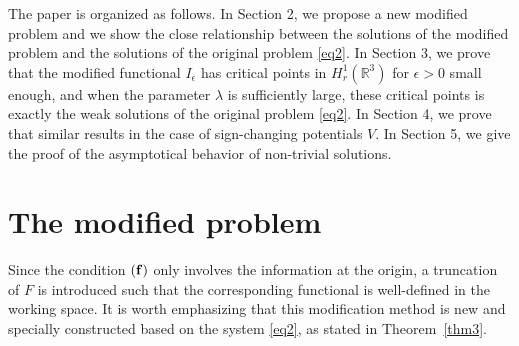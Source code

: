 \documentclass[12pt]{amsart}
\numberwithin{equation}{section}
\theoremstyle{definition}
\begin{document}
The paper is organized as follows. In Section 2, we propose a new modified problem and we show the close relationship between the solutions of the modified problem and the solutions of the original problem \eqref{eq2}. In Section 3, we prove that the modified functional $I_{\epsilon}$ has critical points
in $H^1_r(\mathbb R^3)$ for $\epsilon>0$ small enough, and when the parameter $\lambda$ is sufficiently large, these critical points is exactly the weak solutions of the original problem 
\eqref{eq2}. In Section 4, we prove that similar results in the case of sign-changing potentials $V$. In Section 5, we give the proof of the asymptotical behavior of non-trivial solutions.

\section{The modified problem}\label{section_2}
Since the condition ${\bf (f)}$ only involves the information at the origin, a truncation of $F$ is introduced such that the corresponding functional is well-defined in the working space. It is worth emphasizing that this modification method is new and specially constructed based on the system \eqref{eq2}, as stated in 
Theorem~\ref{thm3}.
\end{document}
